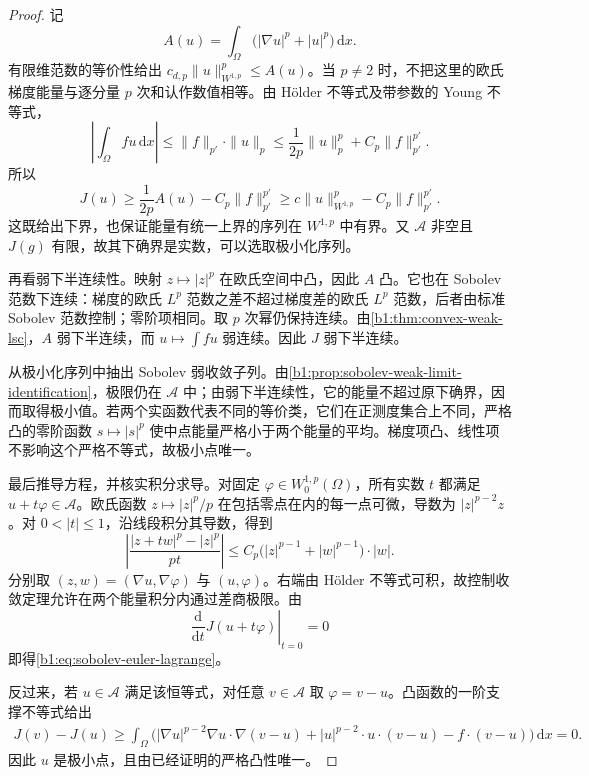 \begin{proof}
记
\[
 A(u)=\int_\Omega\bigl(|\nabla u|^p+|u|^p\bigr)\,\mathrm dx.
\]
有限维范数的等价性给出 \(c_{d,p}\|u\|_{W^{1,p}}^p\le A(u)\)。当 \(p\ne2\) 时，不把这里的欧氏梯度能量与逐分量 \(p\) 次和认作数值相等。由 Hölder 不等式及带参数的 Young 不等式，
\[
 \left|\int_\Omega fu\,\mathrm dx\right|
 \le\|f\|_{p'}\cdot\|u\|_p
 \le\frac1{2p}\|u\|_p^p+C_p\|f\|_{p'}^{p'}.
\]
所以
\[
 J(u)\ge\frac1{2p}A(u)-C_p\|f\|_{p'}^{p'}
 \ge c\|u\|_{W^{1,p}}^p-C_p\|f\|_{p'}^{p'}.
\]
这既给出下界，也保证能量有统一上界的序列在 \(W^{1,p}\) 中有界。又 \(\mathcal A\) 非空且 \(J(g)\) 有限，故其下确界是实数，可以选取极小化序列。

再看弱下半连续性。映射 \(z\mapsto|z|^p\) 在欧氏空间中凸，因此 \(A\) 凸。它也在 Sobolev 范数下连续：梯度的欧氏 \(L^p\) 范数之差不超过梯度差的欧氏 \(L^p\) 范数，后者由标准 Sobolev 范数控制；零阶项相同。取 \(p\) 次幂仍保持连续。由\cref{b1:thm:convex-weak-lsc}，\(A\) 弱下半连续，而 \(u\mapsto\int fu\) 弱连续。因此 \(J\) 弱下半连续。

从极小化序列中抽出 Sobolev 弱收敛子列。由\cref{b1:prop:sobolev-weak-limit-identification}，极限仍在 \(\mathcal A\) 中；由弱下半连续性，它的能量不超过原下确界，因而取得极小值。若两个实函数代表不同的等价类，它们在正测度集合上不同，严格凸的零阶函数 \(s\mapsto|s|^p\) 使中点能量严格小于两个能量的平均。梯度项凸、线性项不影响这个严格不等式，故极小点唯一。

最后推导方程，并核实积分求导。对固定 \(\varphi\in W_0^{1,p}(\Omega)\)，所有实数 \(t\) 都满足 \(u+t\varphi\in\mathcal A\)。欧氏函数 \(z\mapsto|z|^p/p\) 在包括零点在内的每一点可微，导数为 \(|z|^{p-2}z\)。对 \(0<|t|\le1\)，沿线段积分其导数，得到
\[
 \left|\frac{|z+tw|^p-|z|^p}{pt}\right|
 \le C_p\bigl(|z|^{p-1}+|w|^{p-1}\bigr)\cdot|w|.
\]
分别取 \((z,w)=(\nabla u,\nabla\varphi)\) 与 \((u,\varphi)\)。右端由 Hölder 不等式可积，故控制收敛定理允许在两个能量积分内通过差商极限。由
\[
 \left.\frac{\mathrm d}{\mathrm dt}J(u+t\varphi)\right|_{t=0}=0
\]
即得\eqref{b1:eq:sobolev-euler-lagrange}。

反过来，若 \(u\in\mathcal A\) 满足该恒等式，对任意 \(v\in\mathcal A\) 取 \(\varphi=v-u\)。凸函数的一阶支撑不等式给出
\[
 \begin{split}
 J(v)-J(u)\ge
 \int_\Omega\bigl(
  |\nabla u|^{p-2}\nabla u\cdot\nabla(v-u)
       +|u|^{p-2}\cdot u\cdot(v-u)-f\cdot(v-u)
 \bigr)\,\mathrm dx=0.
 \end{split}
\]
因此 \(u\) 是极小点，且由已经证明的严格凸性唯一。
\end{proof}


